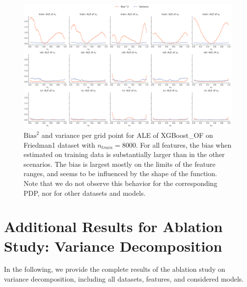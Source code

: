 \documentclass[runningheads]{llncs}
\begin{document}
\begin{figure}
    \centering
    \includegraphics[width=\textwidth]{img/further_investigation/friedman1_ale_XGBoost_OF_8000.png}
    \caption{$\text{Bias}^2$ and variance per grid point for ALE of XGBoost\_OF on Friedman1 dataset with $n_{train} = 8000$.
        For all features, the bias when estimated on training data is substantially larger than in the other scenarios. The bias
        is largest mostly on the limits of the feature ranges, and seems to be influenced by the shape of the function.
        Note that we do not observe this behavior for the corresponding PDP, nor for other datasets and models.
    }
    \label{fig:further-ale-xgb-friedman}  %
\end{figure}

\clearpage
\section{Additional Results for Ablation Study: Variance Decomposition}\label{app:additional-variance-decomposition}

In the following, we provide the complete results of the ablation study on variance decomposition,
including all datasets, features, and considered models.
\end{document}
